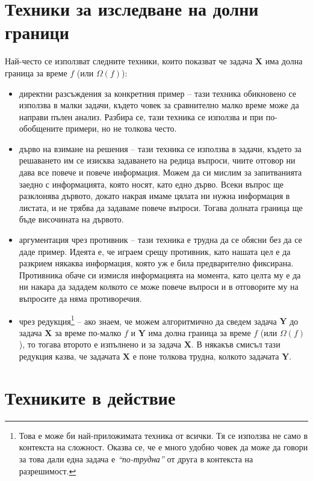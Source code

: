 \documentclass{article}
\theoremstyle{definition}
\theoremstyle{plain}
\theoremstyle{remark}
\theoremstyle{definition}
\begin{document}
\section*{Техники за изследване на долни граници}

Най-често се използват следните техники, които показват че задача $\mathbf{X}$ има долна граница за време $f$ (или $\Omega(f)$):
\begin{itemize}
    \item директни разсъждения за конкретния пример -- тази техника обикновено се използва в малки задачи, където човек за сравнително малко време може да направи пълен анализ.
          Разбира се, тази техника се използва и при по-обобщените примери, но не толкова често.
    \item дърво на взимане на решения -- тази техника се използва в задачи, където за решаването им се изисква задаването на редица въпроси, чиите отговор ни дава все повече и повече информация.
          Можем да си мислим за запитванията заедно с информацията, която носят, като едно дърво.
          Всеки въпрос ще разклонява дървото, докато накрая имаме цялата ни нужна информация в листата, и не трябва да задаваме повече въпроси.
          Тогава долната граница ще бъде височината на дървото.
    \item аргументация чрез противник -- тази техника е трудна да се обясни без да се даде пример.
          Идеята е, че играем срещу противник, като нашата цел е да разкрием някаква информация, която уж е била предварително фиксирана.
          Противника обаче си измисля информацията на момента, като целта му е да ни накара да зададем колкото се може повече въпроси и в отговорите му на въпросите да няма противоречия.
    \item чрез редукция\footnote{
              Това е може би най-приложимата техника от всички.
              Тя се използва не само в контекста на сложност.
              Оказва се, че е много удобно човек да може да говори за това дали една задача е \textit{``по-трудна''} от друга в контекста на разрешимост.
          } -- ако знаем, че можем алгоритмично да сведем задача $\mathbf{Y}$ до задача $\mathbf{X}$ за време по-малко $f$ и $\mathbf{Y}$ има долна граница за време $f$ (или $\Omega(f)$), то тогава второто е изпълнено и за задача $\mathbf{X}$.
          В някакъв смисъл тази редукция казва, че задачата $\mathbf{X}$ е поне толкова трудна, колкото задачата $\mathbf{Y}$.
\end{itemize}

\section*{Техниките в действие}
\end{document}
